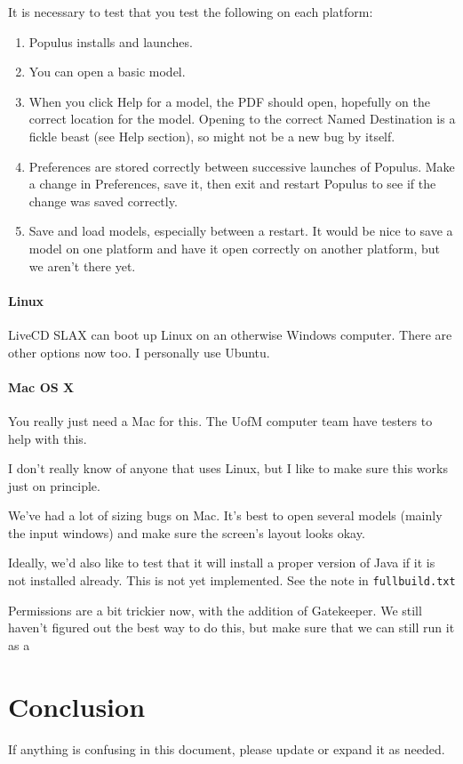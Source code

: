 \documentclass[12pt]{article}
\begin{document}
It is necessary to test that you test the following on each platform:

\begin{enumerate}
	\item Populus installs and launches.
	\item You can open a basic model.
	\item When you click Help for a model, the PDF should open, hopefully on the correct location for the model.  Opening to the correct Named Destination is a fickle beast (see Help section), so might not be a new bug by itself.
	\item Preferences are stored correctly between successive launches of Populus.  Make a change in Preferences, save it, then exit and restart Populus to see if the change was saved correctly.
	\item Save and load models, especially between a restart.  It would be nice to save a model on one platform and have it open correctly on another platform, but we aren't there yet.
\end{enumerate}


\subsection{Linux}
LiveCD SLAX can boot up Linux on an otherwise Windows computer.  There are other options now too.  I personally use Ubuntu.
\subsection{Mac OS X}
You really just need a Mac for this.  The UofM computer team have testers to help with this.

I don't really know of anyone that uses Linux, but I like to make sure this works just on principle.

We've had a lot of sizing bugs on Mac.  It's best to open several models (mainly the input windows) and make sure the screen's layout looks okay.

Ideally, we'd also like to test that it will install a proper version of Java if it is not installed already.  This is not yet implemented.  See the note in \texttt{fullbuild.txt}

Permissions are a bit trickier now, with the addition of Gatekeeper.  We still haven't figured out the best way to do this, but make sure that we can still run it as a 

\part{Conclusion}
If anything is confusing in this document, please update or expand it as needed.
\end{document}
